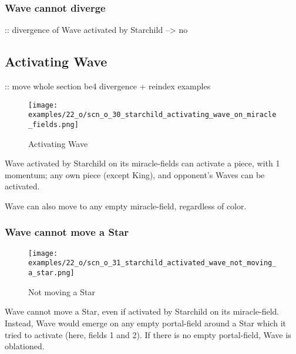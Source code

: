 \vspace*{0.9\baselineskip}
\subsubsection*{Wave cannot diverge}
\label{sec:One/Starchild/Divergence/Wave cannot diverge}

\TODO :: divergence of Wave activated by Starchild --> no

\clearpage %

\subsection*{Activating Wave}
\label{sec:One/Starchild/Activating Wave}

\TODO :: move whole section be4 divergence + reindex examples

\noindent
\begin{wrapfigure}[8]{l}{0.4\textwidth}
\centering
\texttt{[image: examples/22\_o/scn\_o\_30\_starchild\_activating\_wave\_on\_miracle\_fields.png]}
\caption{Activating Wave}
\label{fig:scn_o_30_starchild_activating_wave_on_miracle_fields}
\end{wrapfigure}
Wave activated by Starchild on its miracle-fields can activate a piece, with
1 momentum; any own piece (except King), and opponent's Waves can be activated.

Wave can also move to any empty miracle-field, regardless of color.

\subsubsection*{Wave cannot move a Star}
\label{sec:One/Starchild/Activating Wave/Wave cannot move a Star}

\noindent
\begin{wrapfigure}[9]{l}{0.4\textwidth}
\centering
\texttt{[image: examples/22\_o/scn\_o\_31\_starchild\_activated\_wave\_not\_moving\_a\_star.png]}
\caption{Not moving a Star}
\label{fig:scn_o_31_starchild_activated_wave_not_moving_a_star}
\end{wrapfigure}
Wave cannot move a Star, even if activated by Starchild on its miracle-field.
Instead, Wave would emerge on any empty portal-field around a Star which it tried
to activate (here, fields 1 and 2). If there is no empty portal-field, Wave is
oblationed.

